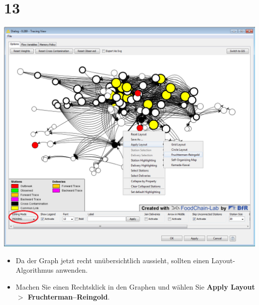 \documentclass{beamer}
\begin{document}
\section{13}
\begin{frame}
	\begin{center}
  		\includegraphics[height=0.6\textheight]{13.png}
	\end{center}
	\begin{itemize}
		\item Da der Graph jetzt recht unübersichtlich aussieht, sollten einen Layout-Algorithmus anwenden.
		\item Machen Sie einen Rechtsklick in den Graphen und wählen Sie \textbf{Apply Layout $>$ Fruchterman–Reingold}.
	\end{itemize}
\end{frame}
\end{document}
